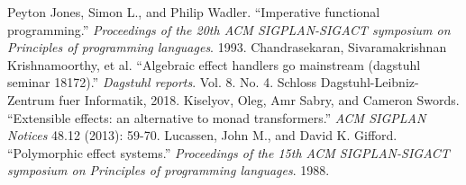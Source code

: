 \documentclass[conference]{IEEEtran}
\begin{document}

    \begin{thebibliography}{00}
         Peyton Jones, Simon L., and Philip Wadler. ``Imperative functional programming.'' \textit{Proceedings of the 20th ACM SIGPLAN-SIGACT symposium on Principles of programming languages}. 1993.
         Chandrasekaran, Sivaramakrishnan Krishnamoorthy, et al. ``Algebraic effect handlers go mainstream (dagstuhl seminar 18172).'' \textit{Dagstuhl reports}. Vol. 8. No. 4. Schloss Dagstuhl-Leibniz-Zentrum fuer Informatik, 2018.
         Kiselyov, Oleg, Amr Sabry, and Cameron Swords. ``Extensible effects: an alternative to monad transformers.'' \textit{ACM SIGPLAN Notices} 48.12 (2013): 59-70.
         Lucassen, John M., and David K. Gifford. ``Polymorphic effect systems.'' \textit{Proceedings of the 15th ACM SIGPLAN-SIGACT symposium on Principles of programming languages}. 1988.
    \end{thebibliography}
\end{document}
